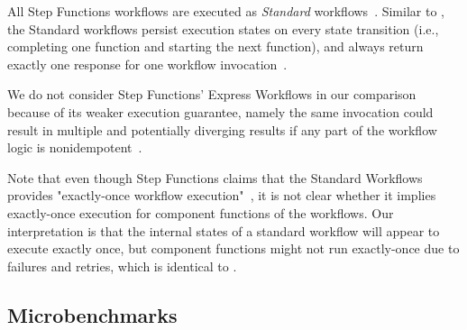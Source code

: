 All Step Functions workflows are executed as \emph{Standard}
workflows~\cite{aws-step-functions-standard-vs-express}. Similar to \name{},
the Standard workflows persist execution states on every state transition
(i.e., completing one function and starting the next function), and always
return exactly one response for one workflow
invocation~\cite{aws-step-functions-exec-gntee}.

We do not consider Step Functions' Express Workflows in our comparison because
of its weaker execution guarantee, namely the same invocation could result in
multiple and potentially diverging results if any part of the workflow logic
is nonidempotent~\cite{aws-step-functions-exec-gntee}.

Note that even though Step Functions claims that the Standard Workflows
provides "exactly-once workflow
execution"~\cite{aws-step-functions-exec-gntee}, it is not clear whether it
implies exactly-once execution for component functions of the workflows. Our
interpretation is that the internal states of a standard workflow will appear
to execute exactly once, but component functions might not run exactly-once
due to failures and retries, which is identical to \name{}. 

\subsection{Microbenchmarks}



